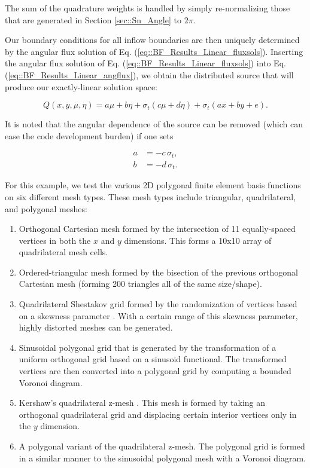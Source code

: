 \noindent The sum of the quadrature weights is handled by simply re-normalizing those that are generated in Section \ref{sec::Sn_Angle} to $2 \pi$.

Our boundary conditions for all inflow boundaries are then uniquely determined by the angular flux solution of Eq. (\ref{eq::BF_Results_Linear_fluxsols}). Inserting the angular flux solution of Eq. (\ref{eq::BF_Results_Linear_fluxsols}) into Eq. (\ref{eq::BF_Results_Linear_angflux}), we obtain the distributed source that will produce our exactly-linear solution space:

\begin{equation}
\label{eq::BF_Results_Linear_src}
Q(x,y,\mu,\eta) = a \mu + b \eta + \sigma_t \left(  c \mu + d \eta \right) + \sigma_t \left( ax +by + e   \right).
\end{equation}

\noindent It is noted that the angular dependence of the source can be removed (which can ease the code development burden) if one sets

\begin{equation}
\label{eq::BF_Results_Linear_removeterms}
\begin{aligned}
	a &= - c \, \sigma_t, \\
	b &= - d \, \sigma_t.
\end{aligned}
\end{equation}

For this example, we test the various 2D polygonal finite element basis functions on six different mesh types. These mesh types include triangular, quadrilateral, and polygonal meshes:

\begin{enumerate}
	\item Orthogonal Cartesian mesh formed by the intersection of 11 equally-spaced vertices in both the $x$ and $y$ dimensions. This forms a 10x10 array of quadrilateral mesh cells.
	\item Ordered-triangular mesh formed by the bisection of the previous orthogonal Cartesian mesh (forming 200 triangles all of the same size/shape).
	\item Quadrilateral Shestakov grid formed by the randomization of vertices based on a skewness parameter \cite{shestakov1988solution,shestakov1990test}. With a certain range of this skewness parameter, highly distorted meshes can be generated.
	\item Sinusoidal polygonal grid that is generated by the transformation of a uniform orthogonal grid based on a sinusoid functional. The transformed vertices are then converted into a polygonal grid by computing a bounded Voronoi diagram.
	\item Kershaw's quadrilateral z-mesh \cite{kershaw1981differencing}. This mesh is formed by taking an orthogonal quadrilateral grid and displacing certain interior vertices only in the $y$ dimension.
	\item A polygonal variant of the quadrilateral z-mesh. The polygonal grid is formed in a similar manner to the sinusoidal polygonal mesh with a Voronoi diagram.
\end{enumerate}

